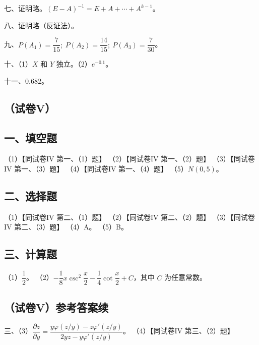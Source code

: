 \documentclass[UTF8,12pt]{ctexart}
\begin{document}
七、证明略。\(\displaystyle (E-A)^{-1}=E+A+\cdots+A^{k-1}\)。


八、证明略（反证法）。


九、\(\displaystyle P(A_1)=\dfrac{\displaystyle 7}{\displaystyle 15};\ P(A_2)=\dfrac{\displaystyle 14}{\displaystyle 15};\ P(A_3)=\dfrac{\displaystyle 7}{\displaystyle 30}\)。


十、（1）\(\displaystyle X\) 和 \(\displaystyle Y\) 独立。（2）\(\displaystyle e^{-0.1}\)。


十一、\(\displaystyle 0.682\)。


\subsection*{（试卷V）}

\subsection*{一、填空题}

（1）【同试卷IV 第一、（1）题】 （2）【同试卷IV 第一、（2）题】 （3）【同试卷IV 第一、（3）题】 （4）【同试卷IV 第一、（4）题】 （5）\(\displaystyle N(0,\allowbreak 5)\)。


\subsection*{二、选择题}

（1）【同试卷IV 第二、（1）题】 （2）【同试卷IV 第二、（2）题】 （3）【同试卷IV 第二、（3）题】 （4）A。 （5）B。


\subsection*{三、计算题}

（1）\(\displaystyle \dfrac{\displaystyle 1}{\displaystyle 2}\)。 （2）\(\displaystyle -\dfrac{\displaystyle 1}{\displaystyle 8}x\csc^2\dfrac{\displaystyle x}{\displaystyle 2}-\dfrac{\displaystyle 1}{\displaystyle 4}\cot\dfrac{\displaystyle x}{\displaystyle 2}+C\)，其中 \(\displaystyle C\) 为任意常数。


\subsection*{（试卷V）参考答案续}

三、（3）\(\displaystyle \dfrac{\displaystyle \partial z}{\displaystyle \partial y}=\dfrac{\displaystyle y\varphi(z/y)-z\varphi\prime(z/y)}{\displaystyle 2yz-y\varphi\prime(z/y)}\)。 （4）【同试卷IV 第三、（2）题】
\end{document}
